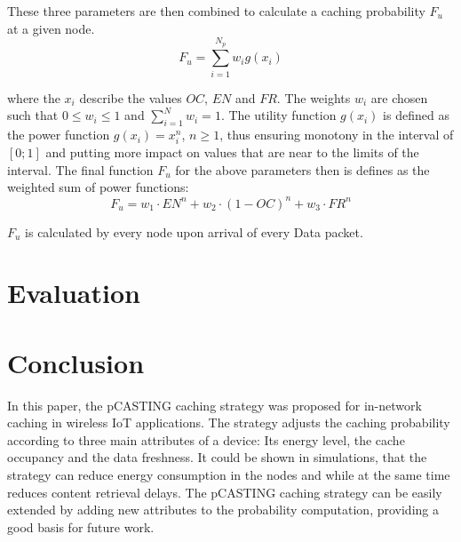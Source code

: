 \documentclass[conference]{IEEEtran}
\begin{document}
These three parameters are then combined to calculate a caching probability $F_u$ at a given node.
\begin{equation}
	F_u = \sum_{i = 1}^{N_p} w_i g(x_i)
\end{equation}

where the $x_i$ describe the values $OC$, $EN$ and $FR$. The weights $w_i$ are chosen such that $0 \leq w_i \leq 1$ and $\sum_{i = 1}^{N} w_i = 1$. The utility function $g(x_i)$ is defined as the power function $g(x_i) = x_i^n$, $n \geq 1$, thus ensuring monotony in the interval of $[0; 1]$ and putting more impact on values that are near to the limits of the interval. The final function $F_u$ for the above parameters then is defines as the weighted sum of power functions:
\begin{equation}
	F_u = w_1 \cdot EN^n + w_2 \cdot (1 - OC)^n + w_3 \cdot FR^n
\end{equation}

$F_u$ is calculated by every node upon arrival of every Data packet.

\section{Evaluation}
\label{sec:eval}

\section{Conclusion}
\label{sec:conclusion}

In this paper, the {pCASTING} caching strategy was proposed for in-network caching in wireless IoT applications. The strategy adjusts the caching probability according to three main attributes of a device: Its energy level, the cache occupancy and the data freshness. It could be shown in simulations, that the strategy can reduce energy consumption in the nodes and while at the same time reduces content retrieval delays. The {pCASTING} caching strategy can be easily extended by adding new attributes to the probability computation, providing a good basis for future work.

\printbibliography
\end{document}
